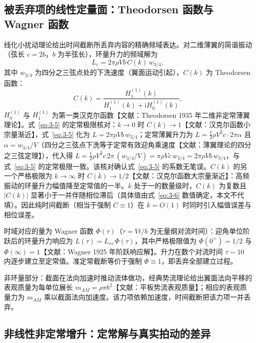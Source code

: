 \documentclass[11pt,a4paper]{ctexart}
\numberwithin{equation}{section}
\begin{document}
\subsection{被丢弃项的线性定量面：Theodorsen 函数与 Wagner 函数}

线化小扰动理论给出时间截断所丢弃内容的精确频域表达。对二维薄翼的简谐振动（弦长 $c = 2b$，$b$ 为半弦长），环量升力的频域解为
\begin{equation}
  L_c = 2\pi\rho V b\, C(k)\, w_{3/4}, \label{eq:3-5}
\end{equation}
其中 $w_{3/4}$ 为四分之三弦点处的下洗速度（翼面运动引起），$C(k)$ 为 Theodorsen 函数：
\begin{equation}
  C(k) = \frac{H_1^{(1)}(k)}{H_1^{(1)}(k) + \mathrm{i}H_0^{(1)}(k)}, \label{eq:3-6}
\end{equation}
$H_0^{(1)}$ 与 $H_1^{(1)}$ 为第一类汉克尔函数【文献：Theodorsen 1935 年二维非定常薄翼理论】。式~\eqref{eq:3-5} 的定常极限核对：$k \to 0$ 时 $C(k) \to 1$【文献：汉克尔函数小宗量渐近】，式~\eqref{eq:3-5} 化为 $L = 2\pi\rho V b\, w_{3/4}$；定常薄翼升力为 $L = \tfrac{1}{2}\rho V^2 c \cdot 2\pi\alpha$ 且 $\alpha = w_{3/4}/V$（四分之三弦点下洗等于定常有效迎角乘速度【文献：薄翼理论的四分之三弦定理】），代入得 $L = \tfrac{1}{2}\rho V^2 c\, 2\pi\,(w_{3/4}/V) = \pi\rho V c\, w_{3/4} = 2\pi\rho V b\, w_{3/4}$，与式~\eqref{eq:3-5} 的定常极限一致。该核对确认式~\eqref{eq:3-5} 的系数无笔误。$C(k)$ 的另一个严格极限为 $k \to \infty$ 时 $C(k) \to 1/2$【文献：汉克尔函数大宗量渐近】：高频振动的环量升力幅值降至定常值的一半。$k$ 处于一的数量级时，$C(k)$ 为复数且 $|C(k)|$ 显著小于一并伴随相位滞后（具体值由式~\eqref{eq:3-6} 数值确定，本文不代填）。因此纯时间截断（相当于强制 $C \equiv 1$）在 $k = O(1)$ 时同时引入幅值误差与相位误差。

时域对应的量为 Wagner 函数 $\Phi(\tau)$（$\tau = Vt/b$ 为无量纲对流时间）：迎角单位阶跃后的环量升力响应为 $L(\tau) = L_{ss}\,\Phi(\tau)$，其中严格极限值为 $\Phi(0^+) = 1/2$ 与 $\Phi(\infty) = 1$【文献：Wagner 1925 年阶跃响应解】。升力在数个对流时间 $\tau \sim 10$ 内逐步建立至定常值。准定常截断等价于强制 $\Phi \equiv 1$，即丢弃全部建立过程。

非环量部分：截面在法向加速时推动流体做功，经典势流理论给出翼面法向平移的表观质量为每单位展长 $m_{AM} = \rho\pi b^2$【文献：平板势流表观质量】；相应的表观质量力为 $m_{AM}$ 乘以截面法向加速度。该力项依赖加速度，时间截断把该力项一并丢弃。

\subsection{非线性非定常增升：定常解与真实拍动的差异}
\end{document}
